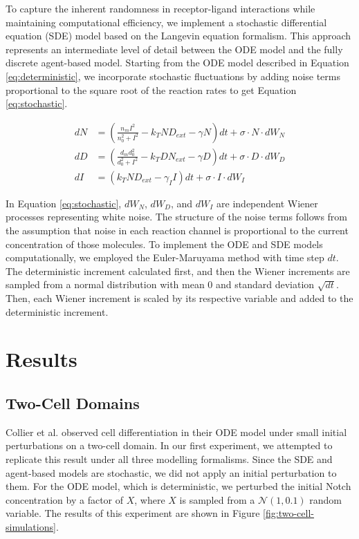 \documentclass{article}
\begin{document}
To capture the inherent randomness in receptor-ligand interactions while maintaining computational efficiency, we implement a stochastic differential equation (SDE) model based on the Langevin equation formalism.
This approach represents an intermediate level of detail between the ODE model and the fully discrete agent-based model.
Starting from the ODE model described in Equation \ref{eq:deterministic}, we incorporate stochastic fluctuations by adding noise terms proportional to the square root of the reaction rates to get Equation \ref{eq:stochastic}.

\begin{equation}
\begin{aligned}
  dN &= \left( \frac{n_{m}I^2}{n_{0}^2 + I^2} - k_{T}ND_{ext} - \gamma N \right) dt + \sigma \cdot N \cdot dW_{N} \\[5pt]
  dD &= \left( \frac{d_{m}d_{0}^2}{d_{0}^2 + I^2} - k_{T}DN_{ext} - \gamma D \right)  dt + \sigma \cdot D \cdot dW_{D}  \\[5pt]
  dI &= \left( k_{T}ND_{ext} - \gamma_{I}I \right) dt + \sigma \cdot I \cdot dW_{I}
\end{aligned}
\label{eq:stochastic}
\end{equation}

In Equation \ref{eq:stochastic}, $dW_N$, $dW_D$, and $dW_I$ are independent Wiener processes representing white noise.
The structure of the noise terms follows from the assumption that noise in each reaction channel is proportional to the current concentration of those molecules.
To implement the ODE and SDE models computationally, we employed the Euler-Maruyama method with time step $dt$.
The deterministic increment calculated first, and then the Wiener increments are sampled from a normal distribution with mean $0$ and standard deviation $\sqrt{dt}$.
Then, each Wiener increment is scaled by its respective variable and added to the deterministic increment.

\section*{Results}

\subsection*{Two-Cell Domains}

Collier et al. \cite{collier_pattern_1996} observed cell differentiation in their ODE model under small initial perturbations on a two-cell domain.
In our first experiment, we attempted to replicate this result under all three modelling formalisms.
Since the SDE and agent-based models are stochastic, we did not apply an initial perturbation to them.
For the ODE model, which is deterministic, we perturbed the initial Notch concentration by a factor of $X$, where $X$ is sampled from a $\mathcal{N}(1, 0.1)$ random variable.
The results of this experiment are shown in Figure \ref{fig:two-cell-simulations}.
\end{document}
